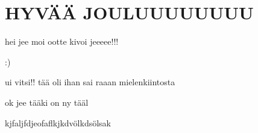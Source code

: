\chapter{HYVÄÄ JOULUUUUUUUU}

hei jee moi ootte kivoi jeeeee!!!

:)

ui vitsi!! tää oli ihan sai raaan mielenkiintosta \cite{petrelliDigitalChristmasExploration2012}

ok jee tääki on ny tääl \cite{zhangConcentrationGradientsEnhancement2021}

kjfaljfdjeofaflkjkdvölkdsölsak